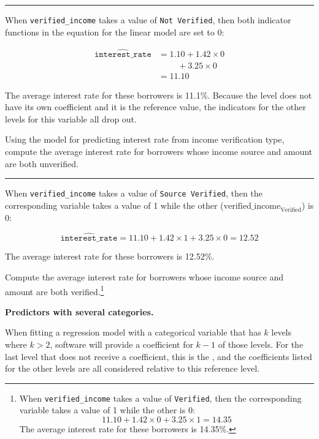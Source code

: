 \documentclass[
  10pt,
  openany]{book}
\theoremstyle{definition}
\theoremstyle{definition}
\theoremstyle{definition}
\theoremstyle{definition}
\theoremstyle{remark}
\begin{document}
\begin{center}\rule{0.5\linewidth}{0.5pt}\end{center}

When \texttt{verified\_income} takes a value of \texttt{Not\ Verified}, then both indicator functions in the equation for the linear model are set to 0:

\begin{align*}
\widehat{\texttt{interest_rate}} &= 1.10 + 1.42 \times 0 \\
&\qquad\ + 3.25 \times 0 \\
&= 11.10
\end{align*}

The average interest rate for these borrowers is 11.1\%.
Because the level does not have its own coefficient and it is the reference value, the indicators for the other levels for this variable all drop out.

Using the model for predicting interest rate from income verification type, compute the average interest rate for borrowers whose income source and amount are both unverified.

\begin{center}\rule{0.5\linewidth}{0.5pt}\end{center}

When \texttt{verified\_income} takes a value of \texttt{Source\ Verified}, then the corresponding variable takes a value of 1 while the other (\(\text{verified_income}_{\text{Verified}}\)) is 0:

\[\widehat{\texttt{interest_rate}} = 11.10 + 1.42 \times 1 + 3.25 \times 0 = 12.52\]

The average interest rate for these borrowers is 12.52\%.

Compute the average interest rate for borrowers whose income source and amount are both verified.\footnote{When \texttt{verified\_income} takes a value of \texttt{Verified}, then the corresponding variable takes a value of 1 while the other is 0: \[11.10 + 1.42 \times 0 + 3.25 \times 1 = 14.35\] The average interest rate for these borrowers is 14.35\%.}

\textbf{Predictors with several categories.}

When fitting a regression model with a categorical variable that has \(k\) levels where \(k > 2\), software will provide a coefficient for \(k - 1\) of those levels.
For the last level that does not receive a coefficient, this is the , and the coefficients listed for the other levels are all considered relative to this reference level.
\end{document}

